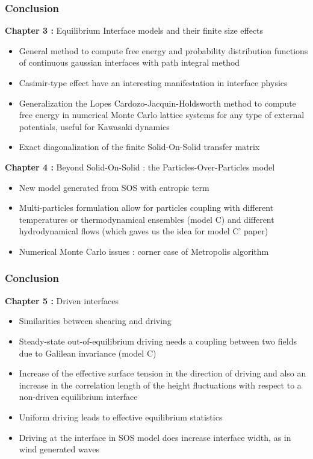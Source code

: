 \documentclass[9pt, dvipsnames]{beamer} %
\begin{document}
\begin{frame}
	\frametitle{Conclusion}
	\begin{block}{{\bf Chapter 3 :} Equilibrium Interface models and their finite size effects}
	\begin{itemize}
		\item General method to compute free energy and probability distribution functions of continuous gaussian interfaces with path integral method
		\item Casimir-type effect have an interesting manifestation in interface physics		
		\item Generalization the Lopes Cardozo-Jacquin-Holdsworth method to compute free energy in numerical Monte Carlo lattice systems for any type of external potentials, useful for Kawasaki dynamics
		\item Exact diagonalization of the finite Solid-On-Solid transfer matrix
	\end{itemize}
	\end{block}
	\begin{block}{{\bf Chapter 4 :} Beyond Solid-On-Solid : the Particles-Over-Particles model}
	\begin{itemize}
		\item New model generated from SOS with entropic term
		\item Multi-particles formulation  allow for particles coupling with different temperatures or thermodynamical ensembles (model C) and different hydrodynamical flows (which gaves us the idea for model C' paper)
		\item Numerical Monte Carlo issues : corner case of Metropolis algorithm
	\end{itemize}
	\end{block}	
\end{frame}


\begin{frame}
    \frametitle{Conclusion}
    \begin{block}{{\bf Chapter 5 :} Driven interfaces}
    \begin{itemize}
    	\item Similarities between shearing and driving
    	\item Steady-state out-of-equilibrium driving needs a coupling between two fields due to Galilean invariance (model C)
        \item Increase of the effective surface tension in the direction of driving and also an increase in the correlation length of the height fluctuations with respect to a non-driven equilibrium interface
        \item Uniform driving leads to effective equilibrium statistics
        \item Driving at the interface in SOS model does increase interface width, as in wind generated waves        
    \end{itemize}
    \end{block}
\end{frame} 
\end{document}
